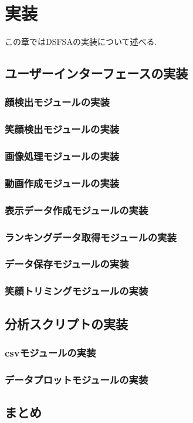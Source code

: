\chapter{実装}
\label{chap:developing}

この章ではDSFSAの実装について述べる.

\section{ユーザーインターフェースの実装}
\subsection{顔検出モジュールの実装}
\subsection{笑顔検出モジュールの実装}
\subsection{画像処理モジュールの実装}
\subsection{動画作成モジュールの実装}
\subsection{表示データ作成モジュールの実装}
\subsection{ランキングデータ取得モジュールの実装}
\subsection{データ保存モジュールの実装}
\subsection{笑顔トリミングモジュールの実装}

\section{分析スクリプトの実装}
\subsection{csvモジュールの実装}
\subsection{データプロットモジュールの実装}
\section{まとめ}
